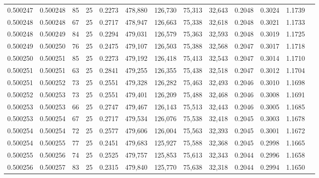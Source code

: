 \begin{tabular}{rrrrrrrrrrrrr}
0.500247 & 0.500248 &  85 &  25 &                                     0.2273 & 478,880 & 126,730 &  75,313 &  32,643 & 0.2048 & 0.3024 & 1.1739 \\
0.500248 & 0.500248 &  67 &  25 &                                     0.2717 & 478,947 & 126,663 &  75,338 &  32,618 & 0.2048 & 0.3021 & 1.1733 \\
0.500248 & 0.500249 &  84 &  25 &                                     0.2294 & 479,031 & 126,579 &  75,363 &  32,593 & 0.2048 & 0.3019 & 1.1725 \\
0.500249 & 0.500250 &  76 &  25 &                                     0.2475 & 479,107 & 126,503 &  75,388 &  32,568 & 0.2047 & 0.3017 & 1.1718 \\
0.500250 & 0.500251 &  85 &  25 &                                     0.2273 & 479,192 & 126,418 &  75,413 &  32,543 & 0.2047 & 0.3014 & 1.1710 \\
0.500251 & 0.500251 &  63 &  25 &                                     0.2841 & 479,255 & 126,355 &  75,438 &  32,518 & 0.2047 & 0.3012 & 1.1704 \\
0.500251 & 0.500252 &  73 &  25 &                                     0.2551 & 479,328 & 126,282 &  75,463 &  32,493 & 0.2046 & 0.3010 & 1.1698 \\
0.500252 & 0.500253 &  73 &  25 &                                     0.2551 & 479,401 & 126,209 &  75,488 &  32,468 & 0.2046 & 0.3008 & 1.1691 \\
0.500253 & 0.500253 &  66 &  25 &                                     0.2747 & 479,467 & 126,143 &  75,513 &  32,443 & 0.2046 & 0.3005 & 1.1685 \\
0.500253 & 0.500254 &  67 &  25 &                                     0.2717 & 479,534 & 126,076 &  75,538 &  32,418 & 0.2045 & 0.3003 & 1.1678 \\
0.500254 & 0.500254 &  72 &  25 &                                     0.2577 & 479,606 & 126,004 &  75,563 &  32,393 & 0.2045 & 0.3001 & 1.1672 \\
0.500254 & 0.500255 &  77 &  25 &                                     0.2451 & 479,683 & 125,927 &  75,588 &  32,368 & 0.2045 & 0.2998 & 1.1665 \\
0.500255 & 0.500256 &  74 &  25 &                                     0.2525 & 479,757 & 125,853 &  75,613 &  32,343 & 0.2044 & 0.2996 & 1.1658 \\
0.500256 & 0.500257 &  83 &  25 &                                     0.2315 & 479,840 & 125,770 &  75,638 &  32,318 & 0.2044 & 0.2994 & 1.1650 \\

\end{tabular}
